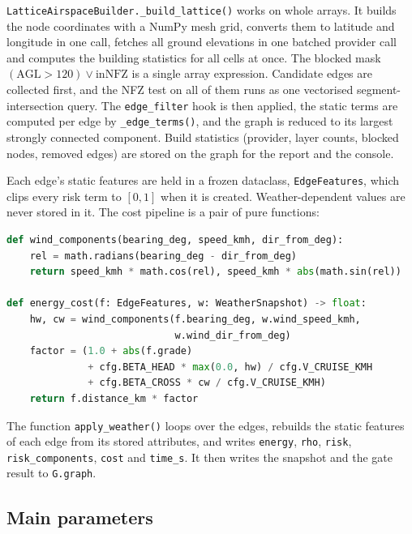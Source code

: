 \documentclass{ssnreview}
\begin{document}
\texttt{LatticeAirspaceBuilder.\_build\_lattice()} works on whole arrays. It builds the
node coordinates with a NumPy mesh grid, converts them to latitude and longitude in one
call, fetches all ground elevations in one batched provider call and computes the
building statistics for all cells at once. The blocked mask
$(\mathrm{AGL} > 120) \lor \mathrm{inNFZ}$ is a single array expression. Candidate edges
are collected first, and the NFZ test on all of them runs as one vectorised
segment-intersection query. The \texttt{edge\_filter} hook is then applied, the static
terms are computed per edge by \texttt{\_edge\_terms()}, and the graph is reduced to its
largest strongly connected component. Build statistics (provider, layer counts, blocked
nodes, removed edges) are stored on the graph for the report and the console.

Each edge's static features are held in a frozen dataclass, \texttt{EdgeFeatures}, which
clips every risk term to $[0,1]$ when it is created. Weather-dependent values are never
stored in it. The cost pipeline is a pair of pure functions:

\begin{lstlisting}[language=Python, caption={Wind decomposition and energy (module1\_graph\_builder.py)}, label={lst:wind}]
def wind_components(bearing_deg, speed_kmh, dir_from_deg):
    rel = math.radians(bearing_deg - dir_from_deg)
    return speed_kmh * math.cos(rel), speed_kmh * abs(math.sin(rel))

def energy_cost(f: EdgeFeatures, w: WeatherSnapshot) -> float:
    hw, cw = wind_components(f.bearing_deg, w.wind_speed_kmh,
                             w.wind_dir_from_deg)
    factor = (1.0 + abs(f.grade)
              + cfg.BETA_HEAD * max(0.0, hw) / cfg.V_CRUISE_KMH
              + cfg.BETA_CROSS * cw / cfg.V_CRUISE_KMH)
    return f.distance_km * factor
\end{lstlisting}

The function \texttt{apply\_weather()} loops over the edges, rebuilds the
static features of each edge from its stored attributes, and writes \texttt{energy}, \texttt{rho},
\texttt{risk}, \texttt{risk\_components}, \texttt{cost} and \texttt{time\_s}. It then
writes the snapshot and the gate result to \texttt{G.graph}.

\subsection{Main parameters}
\end{document}
